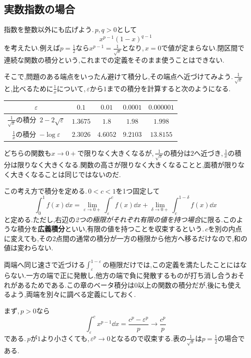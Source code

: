 \subsection{実数指数の場合}

指数を整数以外にも広げよう.\,$p,q>0$として
\[
 x^{p-1}(1-x)^{q-1}
\]
を考えたい.例えば$p=\frac12$なら$x^{p-1}=\frac1{\sqrt x}$となり,\,$x=0$で値が定まらない.閉区間で連続な関数の積分という,これまでの定義をそのまま使うことはできない.

そこで,問題のある端点をいったん避けて積分し,その端点へ近づけてみよう.\,$\frac1{\sqrt x}$と,比べるために$\frac1x$について,\,$\varepsilon$から$1$までの積分を計算すると次のようになる.
\begin{center}
\begin{tabular}{ccccc}
\toprule
$\varepsilon$ & $0.1$ & $0.01$ & $0.0001$ & $0.000001$\\
\midrule
$\frac1{\sqrt x}$の積分\ $2-2\sqrt\varepsilon$ & $1.3675$ & $1.8$ & $1.98$ & $1.998$\\[4pt]
$\frac1x$の積分\ $-\log\varepsilon$ & $2.3026$ & $4.6052$ & $9.2103$ & $13.8155$\\
\bottomrule
\end{tabular}
\end{center}
どちらの関数も$x\to0+$で限りなく大きくなるが,\,$\frac1{\sqrt x}$の積分は$2$へ近づき,\,$\frac1x$の積分は限りなく大きくなる.関数の高さが限りなく大きくなることと,面積が限りなく大きくなることは同じではないのだ.

この考え方で積分を定める.\,$0<c<1$を1つ固定して
\begin{equation}\label{式:両端広義積分の定義}
 \int_0^1 f(x)\dd x
 =\lim_{\varepsilon\to0+}\int_{\varepsilon}^{c}f(x)\dd x
  +\lim_{\delta\to0+}\int_c^{1-\delta}f(x)\dd x
\end{equation}
と定める.ただし,右辺の\emph{2つの極限がそれぞれ有限の値を持つ場合}に限る.このような積分を\textbf{広義積分}といい,有限の値を持つことを収束するという.\,$c$を別の内点に変えても,その2点間の通常の積分が一方の極限から他方へ移るだけなので,和の値は変わらない.

両端へ同じ速さで近づける$\int_{\varepsilon}^{1-\varepsilon}$の極限だけでは,この定義を満たしたことにはならない.一方の端で正に発散し,他方の端で負に発散するものが打ち消し合うおそれがあるためである.この章のベータ積分は0以上の関数の積分だが,後にも使えるよう,両端を別々に調べる定義にしておく.

まず,\,$p>0$なら
\[
 \int_{\varepsilon}^{c}x^{p-1}\dd x
 =\frac{c^p-\varepsilon^p}{p}
 \longrightarrow\frac{c^p}{p}
\]
である.\,$p$が$1$より小さくても,\,$\varepsilon^p\to0$となるので収束する.表の$\frac1{\sqrt x}$は$p=\frac12$の場合である.

